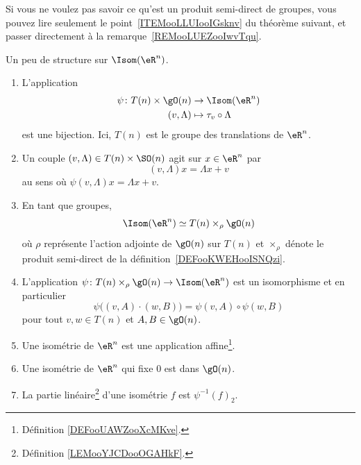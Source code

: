 Si vous ne voulez pas savoir ce qu'est un produit semi-direct de groupes, vous pouvez lire seulement le point~\ref{ITEMooLLUIooIGsknv} du théorème suivant, et passer directement à la remarque~\ref{REMooLUEZooIwvTqu}.
\begin{theorem}     \label{THOooQJSRooMrqQct}
	Un peu de structure sur \( \Isom(\eR^n)\).
	\begin{enumerate}
		\item       \label{ITEMooLLUIooIGsknv}
		      L'application
		      \begin{equation}
			      \begin{aligned}
				      \psi\colon T(n)\times \gO(n) & \to \Isom(\eR^n)           \\
				      (v,\Lambda)                  & \mapsto \tau_v\circ\Lambda
			      \end{aligned}
		      \end{equation}
		      est une bijection. Ici,  \( T(n)\) est le groupe des translations de \( \eR^n\).
		\item		\label{ITEMooBWQSooCJGPmC}
		      Un couple \( (v,\Lambda)\in T(n)\times\SO(n)\) agit sur \( x\in \eR^n\) par
		      \begin{equation}
			      (v,\Lambda)x=\Lambda x+v
		      \end{equation}
		      au sens où \( \psi(v,\Lambda)x=\Lambda x+v\).
		\item       \label{ITEMooEWSIooNKzRxB}
		      En tant que groupes,
		      \begin{equation}
			      \Isom(\eR^n)\simeq T(n)\times_{\rho}\gO(n)
		      \end{equation}
		      où \( \rho\) représente l'action adjointe de \( \gO(n)\) sur \( T(n)\) et \( \times_{\rho}\) dénote le produit semi-direct de la définition~\ref{DEFooKWEHooISNQzi}.
		\item	\label{ITEMooLJAXooZeSzor}
		      L'application \(\psi \colon T(n)\times_{\rho} \gO(n)\to \Isom(\eR^n)  \) est un isomorphisme et en particulier
		      \begin{equation}
			      \psi\big( (v,A)\cdot (w,B) \big)=\psi(v,A)\circ\psi(w,B)
		      \end{equation}
		      pour tout \( v,w\in T(n)\) et \( A,B\in \gO(n)\).
		\item     \label{ITEMooSKUPooBDvNWX}
		      Une isométrie de \( \eR^n\) est une application affine\footnote{Définition \ref{DEFooUAWZooXcMKve}.}.
		\item     \label{ITEMooBZJHooWCPkfM}
		      Une isométrie de \( \eR^n\) qui fixe \( 0\) est dans \( \gO(n)\).
		\item     \label{ITEMooQLNPooSyHaps}
		      La partie linéaire\footnote{Définition \ref{LEMooYJCDooOGAHkF}.} d'une isométrie \( f\) est \( \psi^{-1}(f)_2\).
	\end{enumerate}
\end{theorem}

